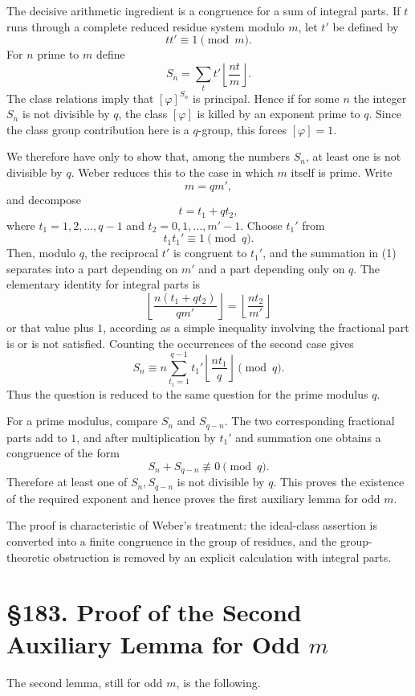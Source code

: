 \documentclass[12pt,a4paper]{article}
\newcommand{\webersection}[2]{\clearpage\section*{\S #1. #2}}
\begin{document}
The decisive arithmetic ingredient is a congruence for a sum of integral parts.  If \(t\) runs through a complete reduced residue system modulo \(m\), let \(t'\) be defined by
\[
  tt'\equiv1\pmod m.
\]
For \(n\) prime to \(m\) define
\[
  S_n=\sum_t t'\left\lfloor\frac{nt}{m}\right\rfloor.
\tag{1}
\]
The class relations imply that \([\varphi]^ {S_n}\) is principal.  Hence if for some \(n\) the integer \(S_n\) is not divisible by \(q\), the class \([\varphi]\) is killed by an exponent prime to \(q\).  Since the class group contribution here is a \(q\)-group, this forces \([\varphi]
=1\).

We therefore have only to show that, among the numbers \(S_n\), at least one is not divisible by \(q\).  Weber reduces this to the case in which \(m\) itself is prime.  Write
\[
  m=qm',
\]
and decompose
\[
  t=t_1+qt_2,
\]
where \(t_1=1,
2,\ldots,q-1\) and \(t_2=0,1,\ldots,m'-1\).  Choose \(t_1'\) from
\[
  t_1t_1'\equiv1\pmod q.
\]
Then, modulo \(q\), the reciprocal \(t'\) is congruent to \(t_1'\), and the summation in (1) separates into a part depending on \(m'\) and a part depending only on \(q\).  The elementary identity for integral parts is
\[
  \left\lfloor\frac{n(t_1+qt_2)}{qm'}\right\rfloor
  =\left\lfloor\frac{nt_2}{m'}\right\rfloor
\tag{2}
\]
or that value plus \(1\), according as a simple inequality involving the fractional part is or is not satisfied.  Counting the occurrences of the second case gives
\[
  S_n\equiv n\sum_{t_1=1}^{q-1} t_1'\left\lfloor\frac{nt_1}{q}\right\rfloor\pmod q.
\tag{3}
\]
Thus the question is reduced to the same question for the prime modulus \(q\).

For a prime modulus, compare \(S_n\) and \(S_{q-n}\).  The two corresponding fractional parts add to \(1\), and after multiplication by \(t_1'
\) and summation one obtains a congruence of the form
\[
  S_n+S_{q-n}\not\equiv0\pmod q.
\tag{4}
\]
Therefore at least one of \(S_n,S_{q-n}\) is not divisible by \(q\).  This proves the existence of the required exponent and hence proves the first auxiliary lemma for odd \(m\).

The proof is characteristic of Weber's treatment: the ideal-class assertion is converted into a finite congruence in the group of residues, and the group-theoretic obstruction is removed by an explicit calculation with integral parts.

\webersection{183}{Proof of the Second Auxiliary Lemma for Odd \(m\)}

The second lemma, still for odd \(m\), is the following.
\end{document}
